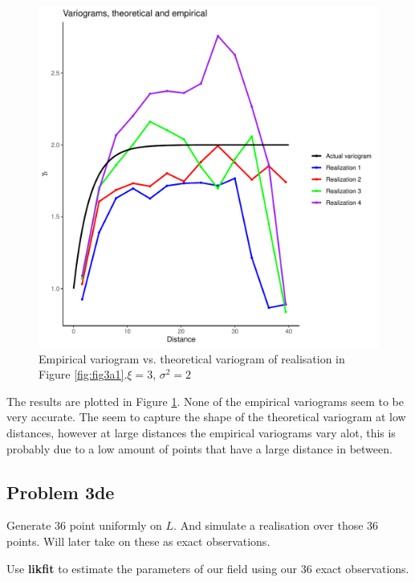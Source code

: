 \documentclass[]{article}
\begin{document}
\begin{figure}

{\centering \includegraphics{Exercise_1_files/figure-latex/fig3b1-1} 

}

\caption{\label{fig:fig3b1} Empirical variogram vs. theoretical variogram of realisation in Figure \ref{fig:fig3a1}.$\xi = 3$, $\sigma^2 = 2$}\label{fig:fig3b1}
\end{figure}

The results are plotted in Figure \ref{fig:fig3b1}. None of the
empirical variograms seem to be very accurate. The seem to capture the
shape of the theoretical variogram at low distances, however at large
distances the empirical variograms vary alot, this is probably due to a
low amount of points that have a large distance in between.

\newpage 

\subsection{Problem 3de}\label{problem-3de}

Generate 36 point uniformly on \(L\). And simulate a realisation over
those 36 points. Will later take on these as exact observations.

Use \textbf{likfit} to estimate the parameters of our field using our 36
exact observations.
\end{document}
